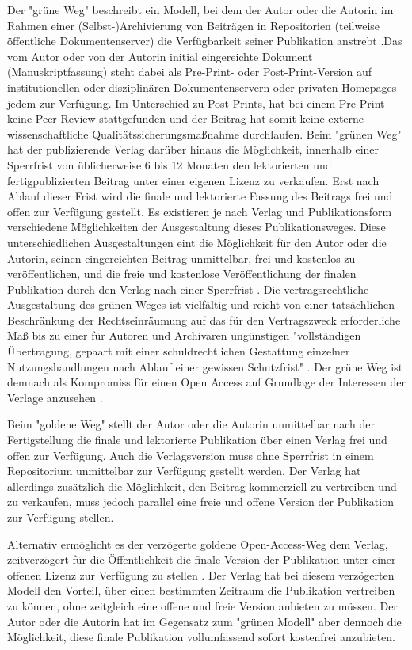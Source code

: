 Der "grüne Weg" beschreibt ein Modell, bei dem der Autor oder die Autorin im Rahmen einer (Selbst-)Archivierung von Beiträgen in Repositorien (teilweise öffentliche Dokumentenserver) die Verfügbarkeit seiner Publikation anstrebt \cite{Brembs_2015} \cite{Mueller_2010} \cite{Grand_2012}.Das vom Autor oder von der Autorin initial eingereichte Dokument (Manuskriptfassung) steht dabei als Pre-Print- oder Post-Print-Version auf institutionellen oder disziplinären Dokumentenservern oder privaten Homepages jedem zur Verfügung. Im Unterschied zu Post-Prints, hat bei einem Pre-Print keine Peer Review stattgefunden und der Beitrag hat somit keine externe wissenschaftliche Qualitätssicherungsmaßnahme durchlaufen. Beim "grünen Weg" hat der publizierende Verlag darüber hinaus die Möglichkeit, innerhalb einer Sperrfrist von üblicherweise 6 bis 12 Monaten den lektorierten und fertigpublizierten Beitrag unter einer eigenen Lizenz zu verkaufen. Erst nach Ablauf dieser Frist wird die finale und lektorierte Fassung des Beitrags frei und offen zur Verfügung gestellt. Es existieren je nach Verlag und Publikationsform verschiedene Möglichkeiten der Ausgestaltung dieses Publikationsweges. Diese unterschiedlichen Ausgestaltungen eint die Möglichkeit für den Autor oder die Autorin, seinen eingereichten Beitrag unmittelbar, frei und kostenlos zu veröffentlichen, und die freie und kostenlose Veröffentlichung der finalen Publikation durch den Verlag nach einer Sperrfrist \cite{Dorschel_2006}. Die vertragsrechtliche Ausgestaltung des grünen Weges ist vielfältig und reicht von einer tatsächlichen Beschränkung der Rechtseinräumung auf das für den Vertragszweck erforderliche Maß bis zu einer für Autoren und Archivaren ungünstigen "vollständigen Übertragung, gepaart mit einer schuldrechtlichen Gestattung einzelner Nutzungshandlungen nach Ablauf einer gewissen Schutzfrist" \cite{Dorschel_2006}. Der grüne Weg ist demnach als Kompromiss für einen Open Access auf Grundlage der Interessen der Verlage anzusehen \cite{Mussell_2013}.

Beim "goldene Weg" stellt der Autor oder die Autorin unmittelbar nach der Fertigstellung die finale und lektorierte Publikation über einen Verlag frei und offen zur Verfügung. Auch die Verlagsversion muss ohne Sperrfrist in einem Repositorium unmittelbar zur Verfügung gestellt werden. Der Verlag hat allerdings zusätzlich die Möglichkeit, den Beitrag kommerziell zu vertreiben und zu verkaufen, muss jedoch parallel eine freie und offene Version der Publikation zur Verfügung stellen.

Alternativ ermöglicht es der verzögerte goldene Open-Access-Weg dem Verlag, zeitverzögert für die Öffentlichkeit die finale Version der Publikation unter einer offenen Lizenz zur Verfügung zu stellen \cite{Lewis_2012}. Der Verlag hat bei diesem verzögerten Modell den Vorteil, über einen bestimmten Zeitraum die Publikation vertreiben zu können, ohne zeitgleich eine offene und freie Version anbieten zu müssen. Der Autor oder die Autorin hat im Gegensatz zum "grünen Modell" aber dennoch die Möglichkeit, diese finale Publikation vollumfassend sofort kostenfrei anzubieten.

